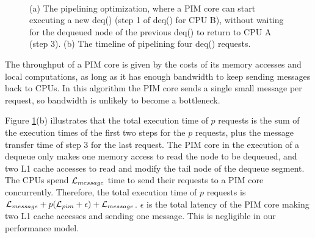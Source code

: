 \begin{figure}[ht!]
\centering
{}
\\

\caption{(a) The pipelining optimization, where a PIM core can start executing 
a new deq() (step 1 of deq() for CPU B), without waiting for the dequeued node of 
the previous deq() to return to CPU A (step 3). 
(b) The timeline of pipelining four deq() requests.}
\label{figure:queue_pipeline}
\end{figure}
 
The throughput of a PIM core is given by the costs of its memory accesses and local computations, 
as long as it has enough bandwidth to keep sending messages back to CPUs.  
In this algorithm the PIM core sends a single small message per request, so bandwidth is unlikely to 
become a bottleneck. 

Figure \ref{figure:queue_pipeline}(b) illustrates that 
the total execution time of $p$ requests is the sum of the execution times of the first two steps 
for the $p$ requests, plus the message transfer time of step 3 for the last request.   
The PIM core in the execution of a dequeue only makes one memory access to read the node 
to be dequeued, and two L1 cache accesses to read and modify the tail node of the dequeue segment.   
The CPUs spend $\mathcal{L}_{message}$ time to send their requests to a PIM core concurrently. 
Therefore, the total execution time of $p$ requests 
is $\mathcal{L}_{message} + p(\mathcal{L}_{pim} + \epsilon) + \mathcal{L}_{message}$. $\epsilon$ 
is the total latency of the PIM core making two L1 cache accesses and sending one message. 
This is negligible in our performance model. 

